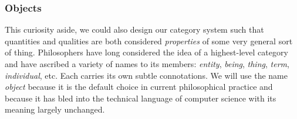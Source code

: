 



\subsubsection{Objects}




This curiosity aside, we could also design our category system such that quantities and qualities are both considered \textit{properties} of some very general sort of thing. Philosophers have long considered the idea of a highest-level category and have ascribed a variety of names to its members: \textit{entity}, \textit{being}, \textit{thing}, \textit{term}, \textit{individual}, etc. Each carries its own subtle connotations. We will use the name \textit{object} because it is the default choice in current philosophical practice and because it has bled into the technical language of computer science with its meaning largely unchanged. \\


